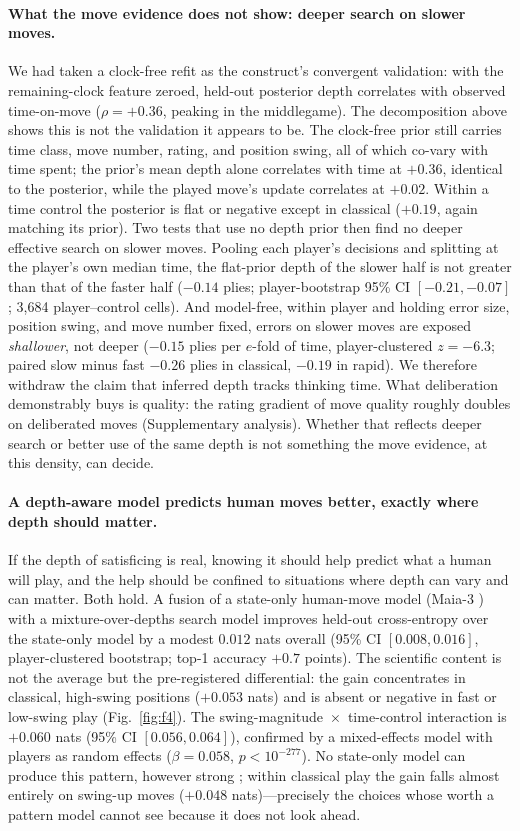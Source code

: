 \paragraph{What the move evidence does not show: deeper search on slower moves.}
We had taken a clock-free refit as the construct's convergent validation: with the
remaining-clock feature zeroed, held-out posterior depth correlates with observed time-on-move
($\rho=+0.36$, peaking in the middlegame). The decomposition above shows this is not the
validation it appears to be. The clock-free prior still carries time class, move number,
rating, and position swing, all of which co-vary with time spent; the prior's mean depth alone
correlates with time at $+0.36$, identical to the posterior, while the played move's update
correlates at $+0.02$. Within a time control the posterior is flat or negative except in
classical ($+0.19$, again matching its prior). Two tests that use no depth prior then find no
deeper effective search on slower moves. Pooling each player's decisions and splitting at the
player's own median time, the flat-prior depth of the slower half is not greater than that of
the faster half ($-0.14$ plies; player-bootstrap 95\% CI $[-0.21,-0.07]$; 3{,}684
player--control cells). And model-free, within player and holding error size, position swing,
and move number fixed, errors on slower moves are exposed \emph{shallower}, not deeper
($-0.15$ plies per $e$-fold of time, player-clustered $z=-6.3$; paired slow minus fast $-0.26$
plies in classical, $-0.19$ in rapid). We therefore withdraw the claim that inferred depth
tracks thinking time. What deliberation demonstrably buys is quality: the rating gradient of
move quality roughly doubles on deliberated moves (Supplementary analysis). Whether that
reflects deeper search or better use of the same depth is not something the move evidence, at
this density, can decide.

\paragraph{A depth-aware model predicts human moves better, exactly where depth should matter.}
If the depth of satisficing is real, knowing it should help predict what a human will play,
and the help should be confined to situations where depth can vary and can matter. Both hold.
A fusion of a state-only human-move model (Maia-3 \citep{monroe2026}) with a mixture-over-depths search model
improves held-out cross-entropy over the state-only model by a modest $0.012$ nats overall
(95\% CI $[0.008,0.016]$, player-clustered bootstrap; top-1 accuracy $+0.7$ points). The
scientific content is not the average but the pre-registered differential: the gain
concentrates in classical, high-swing positions ($+0.053$ nats) and is absent or negative in
fast or low-swing play (Fig.~\ref{fig:f4}). The swing-magnitude~$\times$~time-control
interaction is $+0.060$ nats (95\% CI $[0.056,0.064]$), confirmed by a mixed-effects model
with players as random effects ($\beta=0.058$, $p<10^{-277}$). No state-only model can
produce this pattern, however strong \citep{ruoss2024}; within classical play the gain falls
almost entirely on swing-up moves ($+0.048$ nats)---precisely the choices whose worth a
pattern model cannot see because it does not look ahead.

